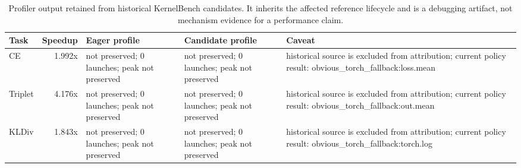 \begin{table}[htbp]
\centering
\caption{Profiler output retained from historical KernelBench candidates. It inherits the affected reference lifecycle and is a debugging artifact, not mechanism evidence for a performance claim.}
\label{tab:kernelbench-loss-profiler}
\scriptsize
\begin{tabularx}{\linewidth}{l r X X X}
\toprule
Task & Speedup & Eager profile & Candidate profile & Caveat \\
\midrule
CE & 1.992x & not preserved; 0 launches; peak not preserved & not preserved; 0 launches; peak not preserved & historical source is excluded from attribution; current policy result: obvious\_torch\_fallback:loss.mean \\
Triplet & 4.176x & not preserved; 0 launches; peak not preserved & not preserved; 0 launches; peak not preserved & historical source is excluded from attribution; current policy result: obvious\_torch\_fallback:out.mean \\
KLDiv & 1.843x & not preserved; 0 launches; peak not preserved & not preserved; 0 launches; peak not preserved & historical source is excluded from attribution; current policy result: obvious\_torch\_fallback:torch.log \\
\bottomrule
\end{tabularx}
\end{table}
